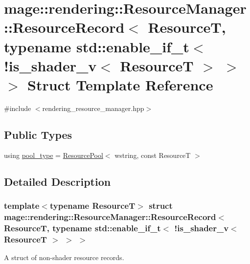 \hypertarget{structmage_1_1rendering_1_1_resource_manager_1_1_resource_record_3_01_resource_t_00_01typename_0d1bec05cbaa53974b1eda0724091f851}{}\section{mage\+:\+:rendering\+:\+:Resource\+Manager\+:\+:Resource\+Record$<$ ResourceT, typename std\+:\+:enable\+\_\+if\+\_\+t$<$ !is\+\_\+shader\+\_\+v$<$ ResourceT $>$ $>$ $>$ Struct Template Reference}
\label{structmage_1_1rendering_1_1_resource_manager_1_1_resource_record_3_01_resource_t_00_01typename_0d1bec05cbaa53974b1eda0724091f851}


{\ttfamily \#include $<$rendering\+\_\+resource\+\_\+manager.\+hpp$>$}

\subsection*{Public Types}
\begin{DoxyCompactItemize}
\item 
using \hyperlink{structmage_1_1rendering_1_1_resource_manager_1_1_resource_record_3_01_resource_t_00_01typename_0d1bec05cbaa53974b1eda0724091f851_a66a879f2c07d717cfc63ccd7d997397e}{pool\+\_\+type} = \hyperlink{classmage_1_1_resource_pool}{Resource\+Pool}$<$ wstring, const ResourceT $>$
\end{DoxyCompactItemize}


\subsection{Detailed Description}
\subsubsection*{template$<$typename ResourceT$>$\newline
struct mage\+::rendering\+::\+Resource\+Manager\+::\+Resource\+Record$<$ Resource\+T, typename std\+::enable\+\_\+if\+\_\+t$<$ !is\+\_\+shader\+\_\+v$<$ Resource\+T $>$ $>$ $>$}

A struct of non-\/shader resource records.


